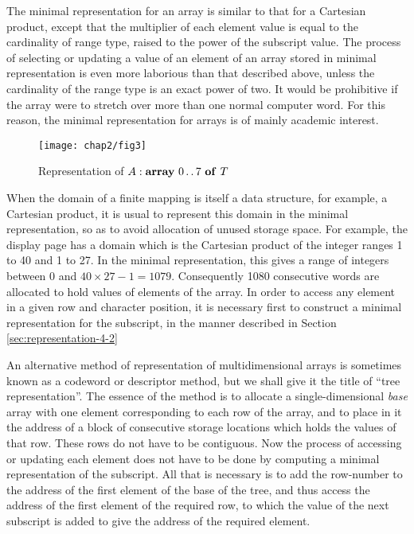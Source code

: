 The minimal representation for an array is similar to that for a Cartesian product, except that the multiplier of each element value is equal to the cardinality of range type, raised to the power of the subscript value. The process of selecting or updating a value of an element of an array stored in minimal representation is even more laborious than that described above, unless the cardinality of the range type is an exact power of two. It would be prohibitive if the array were to stretch over more than one normal computer word. For this reason, the minimal representation for arrays is of mainly academic interest.

\begin{figure}[h]
	\centering
	\texttt{[image: chap2/fig3]}
	\caption{Representation of $A:\text{\textbf{array} } 0\,.\,.\,7 \text{ \textbf{of} } T$}
\end{figure}

When the domain of a finite mapping is itself a data structure, for example, a Cartesian product, it is usual to represent this domain in the minimal representation, so as to avoid allocation of unused storage space. For example, the display page has a domain which is the Cartesian product of the integer ranges 1 to 40 and 1 to 27. In the minimal representation, this gives a range of integers between 0 and $40 \times 27 - 1 = 1079$. Consequently 1080 consecutive words are allocated to hold values of elements of the array. In order to access any element in a given row and character position, it is necessary first to construct a minimal representation for the subscript, in the manner described in Section \ref{sec:representation-4-2}

An alternative method of representation of multidimensional arrays is sometimes known as a codeword or descriptor method, but we shall give it the title of ``tree representation''. The essence of the method is to allocate a single-dimensional \textit{base} array with one element corresponding to each row of the array, and to place in it the address of a block of consecutive storage locations which holds the values of that row. These rows do not have to be contiguous. Now the process of accessing or updating each element does not have to be done by computing a minimal representation of the subscript. All that is necessary is to add the row-number to the address of the first element of the base of the tree, and thus access the address of the first element of the required row, to which the value of the next subscript is added to give the address of the required element.

